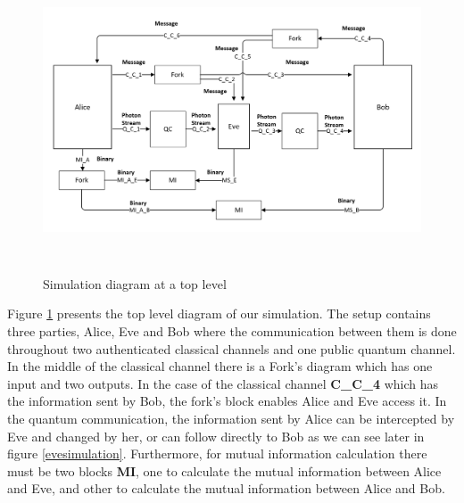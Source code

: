 \begin{figure}[H]
	\centering
	\includegraphics[width=1.0\textwidth, height=9cm]{./sdf/bb84_with_discrete_variables/figures/toplevel_simulation.png}
	\caption{Simulation diagram at a top level}\label{toplevelsimulation}
\end{figure}

Figure \ref{toplevelsimulation} presents the top level diagram of our simulation. The setup contains three parties, Alice, Eve and Bob where the communication between them is done throughout two authenticated classical channels and one public quantum channel. In the middle of the classical channel there is a Fork's diagram which has one input and two outputs. In the case of the classical channel \textbf{C\_C\_4} which has the information sent by Bob, the fork's block enables Alice and Eve access it. In the quantum communication, the information sent by Alice can be intercepted by Eve and changed by her, or can follow directly to Bob as we can see later in figure \ref{evesimulation}. Furthermore, for mutual information calculation there must be two blocks \textbf{MI}, one to calculate the mutual information between Alice and Eve, and other to calculate the mutual information between Alice and Bob.

